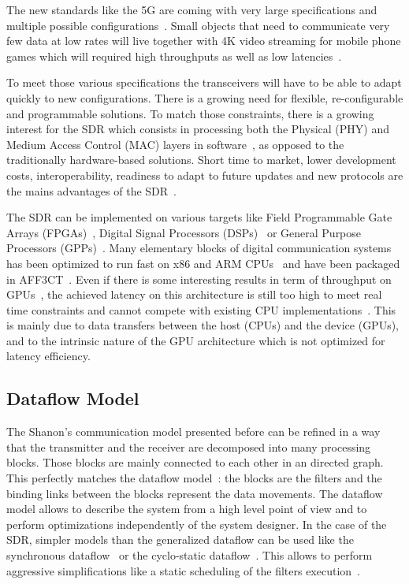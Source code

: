 The new standards like the 5G are coming with very large specifications and
multiple possible configurations~\cite{ETSI2018}. Small objects that need to
communicate very few data at low rates will live together with 4K video
streaming for mobile phone games which will required high throughputs as well as
low latencies~\cite{Rost2014}.

To meet those various specifications the transceivers will have to be able to
adapt quickly to new configurations. There is a growing need for flexible,
re-configurable and programmable solutions. To match those constraints, there is
a growing interest for the SDR which consists in processing both the Physical
(PHY) and Medium Access Control (MAC) layers in software~\cite{Mitola1993}, as
opposed to the traditionally hardware-based solutions. Short time to market,
lower development costs, interoperability, readiness to adapt to future updates
and new protocols are the mains advantages of the SDR~\cite{Akeela2018}.

The SDR can be implemented on various targets like Field Programmable Gate
Arrays (FPGAs)~\cite{Coulton2004,Skey2006,Dutta2010,Shaik2013,Maheshwarappa2015,
Nivin2016}, Digital Signal Processors (DSPs)~\cite{Kaur2008,Karlsson2013,
Shaik2013} or General Purpose Processors (GPPs)~\cite{Yoge2012,Bang2014,
Meshram2019,Grayver2020}. Many elementary blocks of digital communication
systems has been optimized to run fast on x86 and ARM
CPUs~\cite{Cassagne2015c,Cassagne2016a,Cassagne2016b,Cassagne2018,Leonardon2019,
Ghaffari2019} and have been packaged in AFF3CT~\cite{Cassagne2017a,
Cassagne2019a}. Even if there is some interesting results in term of throughput
on GPUs~\cite{Xianjun2013,Li2014,LeGal2014a,Giard2016b,Keskin2017a}, the
achieved latency on this architecture is still too high to meet real time
constraints and cannot compete with existing CPU
implementations~\cite{LeGal2015a,Cassagne2015c,Giard2016b,Cassagne2016a,
LeGal2017,Leonardon2019,LeGal2019a}. This is mainly due to data transfers
between the host (CPUs) and the device (GPUs), and to the intrinsic nature of
the GPU architecture which is not optimized for latency efficiency.

\subsection{Dataflow Model}

The Shanon's communication model presented before can be refined in a way
that the transmitter and the receiver are decomposed into many processing
blocks. Those blocks are mainly connected to each other in an directed graph.
This perfectly matches the dataflow model~\cite{Dennis1980,Ackerman1982}: the
blocks are the filters and the binding links between the blocks represent the
data movements. The dataflow model allows to describe the system from a high
level point of view and to perform optimizations independently of the system
designer. In the case of the SDR, simpler models than the generalized dataflow
can be used like the synchronous dataflow~\cite{Lee1987} or the cyclo-static
dataflow~\cite{Engels1994,Bilsen1995}. This allows to perform aggressive
simplifications like a static scheduling of the filters
execution~\cite{Parks1995}.


